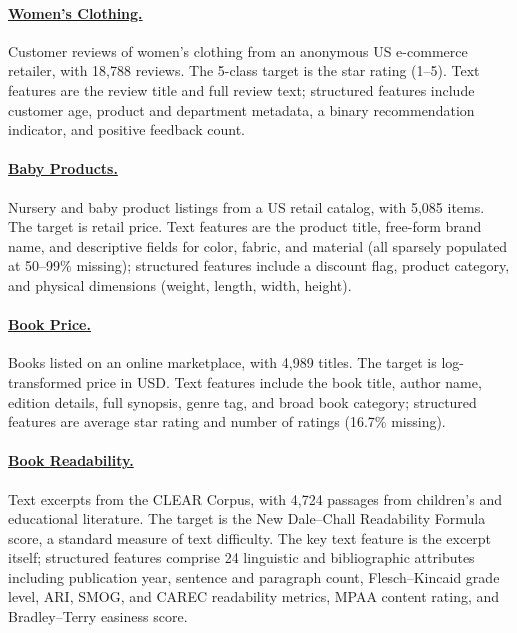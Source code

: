 \paragraph{\href{https://www.openml.org/search?type=data&id=46659}{Women's Clothing.}}
Customer reviews of women's clothing from an anonymous US e-commerce retailer, with 18,788 reviews.
The 5-class target is the star rating (1--5).
Text features are the review title and full review text; structured features include customer age, product and department metadata, a binary recommendation indicator, and positive feedback count.

\paragraph{\href{http://pages.cs.wisc.edu/~anhai/data/784_data/baby_products/}{Baby Products.}}
Nursery and baby product listings from a US retail catalog, with 5,085 items.
The target is retail price.
Text features are the product title, free-form brand name, and descriptive fields for color, fabric, and material (all sparsely populated at 50--99\% missing); structured features include a discount flag, product category, and physical dimensions (weight, length, width, height).

\paragraph{\href{https://www.openml.org/search?type=data&id=46663}{Book Price.}}
Books listed on an online marketplace, with 4,989 titles.
The target is log-transformed price in USD.
Text features include the book title, author name, edition details, full synopsis, genre tag, and broad book category; structured features are average star rating and number of ratings (16.7\% missing).

\paragraph{\href{https://www.kaggle.com/datasets/verracodeguacas/clear-corpus}{Book Readability.}}
Text excerpts from the CLEAR Corpus, with 4,724 passages from children's and educational literature.
The target is the New Dale--Chall Readability Formula score, a standard measure of text difficulty.
The key text feature is the excerpt itself; structured features comprise 24 linguistic and bibliographic attributes including publication year, sentence and paragraph count, Flesch--Kincaid grade level, ARI, SMOG, and CAREC readability metrics, MPAA content rating, and Bradley--Terry easiness score.

